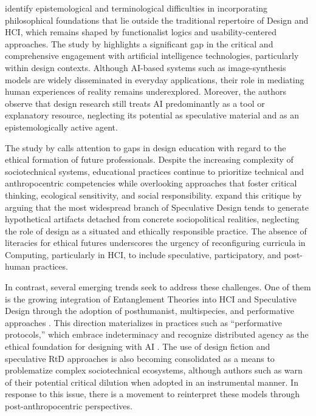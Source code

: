  identify epistemological and terminological difficulties in incorporating philosophical foundations that lie outside the traditional repertoire of Design and HCI, which remains shaped by functionalist logics and usability-centered approaches. The study by  highlights a significant gap in the critical and comprehensive engagement with artificial intelligence technologies, particularly within design contexts. Although AI-based systems such as image-synthesis models are widely disseminated in everyday applications, their role in mediating human experiences of reality remains underexplored. Moreover, the authors observe that design research still treats AI predominantly as a tool or explanatory resource, neglecting its potential as speculative material and as an epistemologically active agent.

The study by  calls attention to gaps in design education with regard to the ethical formation of future professionals. Despite the increasing complexity of sociotechnical systems, educational practices continue to prioritize technical and anthropocentric competencies while overlooking approaches that foster critical thinking, ecological sensitivity, and social responsibility.  expand this critique by arguing that the most widespread branch of Speculative Design tends to generate hypothetical artifacts detached from concrete sociopolitical realities, neglecting the role of design as a situated and ethically responsible practice. The absence of literacies for ethical futures underscores the urgency of reconfiguring curricula in Computing, particularly in HCI, to include speculative, participatory, and post-human practices.


In contrast, several emerging trends seek to address these challenges. One of them is the growing integration of Entanglement Theories into HCI and Speculative Design through the adoption of posthumanist, multispecies, and performative approaches \cite{dorrenbacher2023intricacies, calderwood2024designing, bekker2023challenges}. This direction materializes in practices such as ``performative protocols,'' which embrace indeterminacy and recognize distributed agency as the ethical foundation for designing with AI \cite{calderwood2024designing}. The use of design fiction and speculative RtD approaches is also becoming consolidated as a means to problematize complex sociotechnical ecosystems, although authors such as  warn of their potential critical dilution when adopted in an instrumental manner. In response to this issue, there is a movement to reinterpret these models through post-anthropocentric perspectives.

